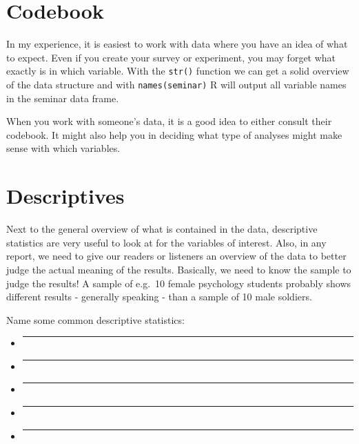 \documentclass[
]{book}
\begin{document}
\section{Codebook}\label{codebook}

In my experience, it is easiest to work with data where you have an idea of what to expect.
Even if you create your survey or experiment, you may forget what exactly is in which variable.
With the \texttt{str()} function we can get a solid overview of the data structure and with \texttt{names(seminar)} R will output all variable names in the seminar data frame.

When you work with someone's data, it is a good idea to either consult their codebook.
It might also help you in deciding what type of analyses might make sense with which variables.

\section{Descriptives}\label{descriptives}

Next to the general overview of what is contained in the data, descriptive statistics are very useful to look at for the variables of interest.
Also, in any report, we need to give our readers or listeners an overview of the data to better judge the actual meaning of the results.
Basically, we need to know the sample to judge the results!
A sample of e.g.~10 female psychology students probably shows different results - generally speaking - than a sample of 10 male soldiers.

Name some common descriptive statistics:

\begin{itemize}
\item
  \begin{center}\rule{0.5\linewidth}{0.5pt}\end{center}
\item
  \begin{center}\rule{0.5\linewidth}{0.5pt}\end{center}
\item
  \begin{center}\rule{0.5\linewidth}{0.5pt}\end{center}
\item
  \begin{center}\rule{0.5\linewidth}{0.5pt}\end{center}
\item
  \begin{center}\rule{0.5\linewidth}{0.5pt}\end{center}
\end{itemize}
\end{document}
